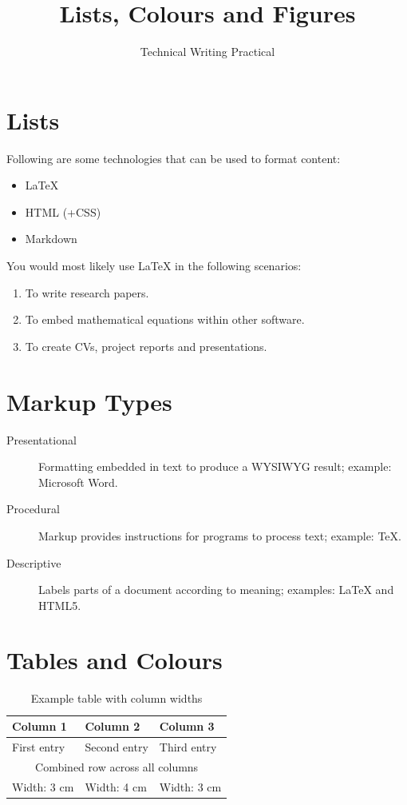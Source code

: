 \documentclass[11pt,a4paper]{article}
\title{Lists, Colours and Figures}
\author{Technical Writing Practical}
\date{}
\begin{document}
\maketitle

\section{Lists}

Following are some technologies that can be used to format content:

\begin{itemize}
    \item \LaTeX
    \item HTML (+CSS)
    \item Markdown
\end{itemize}

You would most likely use \LaTeX{} in the following scenarios:

\begin{enumerate}
    \item To write research papers.
    \item To embed mathematical equations within other software.
    \item To create CVs, project reports and presentations.
\end{enumerate}

\section{Markup Types}

\begin{description}
    \item[Presentational] Formatting embedded in text to produce a WYSIWYG result; example: Microsoft Word.

    \item[Procedural] Markup provides instructions for programs to process text; example: \TeX.

    \item[Descriptive] Labels parts of a document according to meaning; examples: \LaTeX{} and HTML5.
\end{description}

\section{Tables and Colours}

\begin{table}[H]
\centering
\caption{Example table with column widths}

\begin{tabular}{|p{3cm}|p{4cm}|p{3cm}|}
\hline
\textbf{Column 1} & \textbf{Column 2} & \textbf{Column 3}\\
\hline
First entry & Second entry & Third entry\\
\hline
\multicolumn{3}{|c|}{Combined row across all columns}\\
\hline
Width: 3 cm & Width: 4 cm & Width: 3 cm\\
\hline
\end{tabular}
\end{table}
\end{document}

